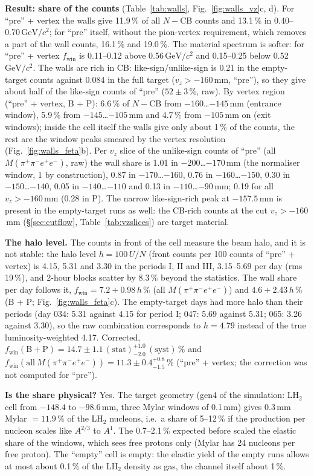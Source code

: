 \documentclass[11pt,a4paper]{article}
\newcommand{\Mfour}{\ensuremath{M(\pi^{+}\pi^{-}e^{+}e^{-})}\xspace}
\newcommand{\GeVcc}{\ensuremath{\mathrm{GeV}/c^{2}}\xspace}
\newcommand{\code}[1]{\texttt{\detokenize{#1}}}
\newcommand{\vz}{\ensuremath{v_z}\xspace}
\newcommand{\fwin}{\ensuremath{f_{\mathrm{win}}}\xspace}
\begin{document}
\textbf{Result: share of the counts} (Table~\ref{tab:walls}, Fig.~\ref{fig:walls_vz}c, d). For ``pre'' + vertex the walls give 11.9\,\% of
all $N-\mathrm{CB}$ counts and 13.1\,\% in 0.40--0.70\,\GeVcc; for ``pre'' itself, without the pion-vertex requirement, which removes a part of the wall counts, 16.1\,\% and
19.0\,\%. The material spectrum is softer: for ``pre'' + vertex \fwin is 0.11--0.12 above 0.56\,\GeVcc and 0.15--0.25 below 0.52\,\GeVcc. The
walls are rich in CB: like-sign/unlike-sign is 0.21 in the empty-target counts against 0.084 in the full target ($\vz>-160$\,mm, ``pre''), so
they give about half of the like-sign counts of ``pre'' ($52\pm3$\,\%, raw). By vertex region (``pre'' + vertex, B + P): 6.6\,\% of
$N-\mathrm{CB}$ from $-160$\dots$-145$\,mm (entrance window), 5.9\,\% from $-145$\dots$-105$\,mm and 4.7\,\% from $-105$\,mm on (exit
windows); inside the cell itself the walls give only about 1\,\% of the counts, the rest are the window peaks smeared by the vertex resolution
(Fig.~\ref{fig:walls_feta}b). Per \vz slice of the unlike-sign counts of ``pre'' (all \Mfour, raw) the wall share is 1.01 in $-200$\dots$-170$\,mm
(the normaliser window, 1 by construction), 0.87 in $-170$\dots$-160$, 0.76 in $-160$\dots$-150$, 0.30 in $-150$\dots$-140$, 0.05 in
$-140$\dots$-110$ and 0.13 in $-110$\dots$-90$\,mm; 0.19 for all $\vz>-160$\,mm (0.28 in P). The narrow like-sign-rich peak at $-157.5$\,mm is
present in the empty-target runs as well: the CB-rich counts at the cut $\vz>-160$\,mm (\S\ref{sec:cutflow}, Table~\ref{tab:vzslices}) are
target material.

\textbf{The halo level.} The counts in front of the cell measure the beam halo, and it is not stable: the halo level $h=100\,U/N$ (front counts
per 100 counts of ``pre'' + vertex) is 4.15, 5.31 and 3.30 in the periods I, II and III, 3.15--5.69 per day (rms 19\,\%), and 2-hour blocks
scatter by 8.3\,\% beyond the statistics. The wall share per day follows it, $\fwin=7.2+0.98\,h$\,\% (all \Mfour) and $4.6+2.43\,h$\,\% (B + P;
Fig.~\ref{fig:walls_feta}c). The empty-target days had more halo than their periods (day 034: 5.31 against 4.15 for period I; 047: 5.69
against 5.31; 065: 3.26 against 3.30), so the raw combination corresponds to $h=4.79$ instead of the true luminosity-weighted 4.17.
Corrected, $\fwin(\mathrm{B+P})=14.7\pm1.1\,(\mathrm{stat})^{+1.0}_{-2.0}\,(\mathrm{syst})$\,\% and $\fwin(\mathrm{all}\ \Mfour)=11.3\pm0.4^{+0.8}_{-1.5}$\,\%
(``pre'' + vertex; the correction was not computed for ``pre'').

\textbf{Is the share physical?} Yes. The target geometry (gen4 \code{target.geo} of the simulation: LH$_2$ cell from $-148.4$ to $-98.6$\,mm,
three Mylar windows of 0.1\,mm) gives 0.3\,mm Mylar $=11.9$\,\% of the LH$_2$ nucleons, i.e.\ a share of 5--12\,\% if the production per
nucleon scales like $A^{2/3}$ to $A^1$. The 0.7--2.1\,\% expected before scaled the elastic share of the windows, which sees free protons only
(Mylar has 24 nucleons per free proton). The ``empty'' cell is empty: the elastic yield of the empty runs allows at most about 0.1\,\% of the
LH$_2$ density as gas, the channel itself about 1\,\%.
\end{document}

